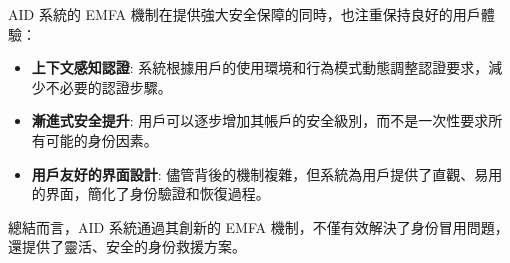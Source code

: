 AID 系統的 EMFA 機制在提供強大安全保障的同時，也注重保持良好的用戶體驗：

\begin{itemize}
  \item \textbf{上下文感知認證}: 系統根據用戶的使用環境和行為模式動態調整認證要求，減少不必要的認證步驟。
  \item \textbf{漸進式安全提升}: 用戶可以逐步增加其帳戶的安全級別，而不是一次性要求所有可能的身份因素。
  \item \textbf{用戶友好的界面設計}: 儘管背後的機制複雜，但系統為用戶提供了直觀、易用的界面，簡化了身份驗證和恢復過程。
\end{itemize}

總結而言，AID 系統通過其創新的 EMFA 機制，不僅有效解決了身份冒用問題，還提供了靈活、安全的身份救援方案。
